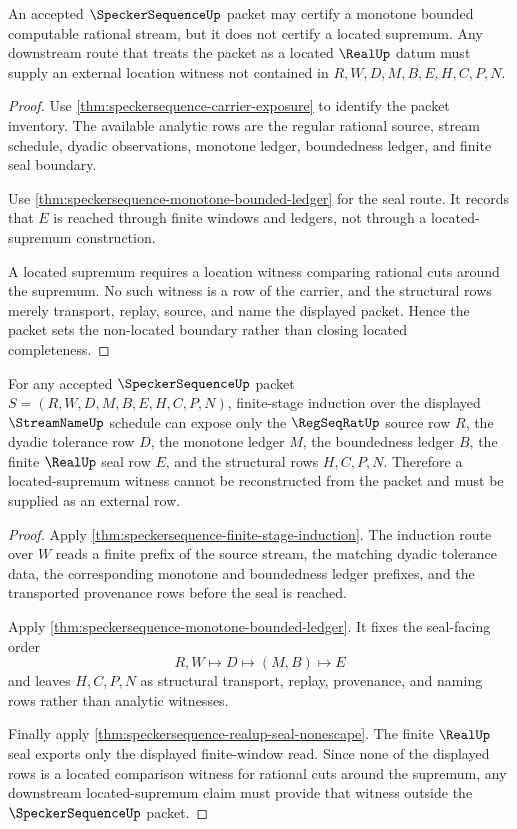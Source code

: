 \begin{theorem}
\label{thm:speckersequence-nonlocated-supremum-boundary}
An accepted $\SpeckerSequenceUp$ packet may certify a monotone bounded computable rational stream, but it does not certify a located supremum. Any downstream route that treats the packet as a located $\RealUp$ datum must supply an external location witness not contained in $R,W,D,M,B,E,H,C,P,N$.
\end{theorem}
\begin{proof}
Use \autoref{thm:speckersequence-carrier-exposure} to identify the packet inventory. The available analytic rows are the regular rational source, stream schedule, dyadic observations, monotone ledger, boundedness ledger, and finite seal boundary.

Use \autoref{thm:speckersequence-monotone-bounded-ledger} for the seal route. It records that $E$ is reached through finite windows and ledgers, not through a located-supremum construction.

A located supremum requires a location witness comparing rational cuts around the supremum. No such witness is a row of the carrier, and the structural rows merely transport, replay, source, and name the displayed packet. Hence the packet sets the non-located boundary rather than closing located completeness.
\end{proof}

\begin{theorem}
\label{thm:specker-sequence-located-supremum-refusal}
For any accepted $\SpeckerSequenceUp$ packet $S=(R,W,D,M,B,E,H,C,P,N)$, finite-stage induction over the displayed $\StreamNameUp$ schedule can expose only the $\RegSeqRatUp$ source row $R$, the dyadic tolerance row $D$, the monotone ledger $M$, the boundedness ledger $B$, the finite $\RealUp$ seal row $E$, and the structural rows $H,C,P,N$. Therefore a located-supremum witness cannot be reconstructed from the packet and must be supplied as an external row.
\end{theorem}
\begin{proof}
Apply \autoref{thm:speckersequence-finite-stage-induction}. The induction route over $W$ reads a finite prefix of the source stream, the matching dyadic tolerance data, the corresponding monotone and boundedness ledger prefixes, and the transported provenance rows before the seal is reached.

Apply \autoref{thm:speckersequence-monotone-bounded-ledger}. It fixes the seal-facing order
$$
R,W\longmapsto D\longmapsto (M,B)\longmapsto E
$$
and leaves $H,C,P,N$ as structural transport, replay, provenance, and naming rows rather than analytic witnesses.

Finally apply \autoref{thm:speckersequence-realup-seal-nonescape}. The finite $\RealUp$ seal exports only the displayed finite-window read. Since none of the displayed rows is a located comparison witness for rational cuts around the supremum, any downstream located-supremum claim must provide that witness outside the $\SpeckerSequenceUp$ packet.
\end{proof}

